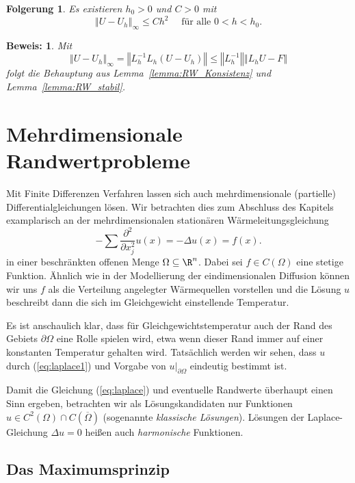 \documentclass[
]{mycourse}
\theoremstyle{mythm}
\newtheorem{korollar}[theorem]{Folgerung}
\theoremstyle{break}
\newtheorem*{beweis}{Beweis:}
\newcommand{\norm}[1]{\left\Vert#1\right\Vert}		%
\newcommand{\labeq}[1]{\label{eq:#1}}			%
\newcommand{\req}[1]{(\ref{eq:#1})}
\begin{document}
\begin{korollar}
Es existieren $h_0>0$ und $C>0$ mit 
\[
\norm{U-U_h}_\infty\leq C h^2 \quad \mbox{ für alle } 0<h<h_0.
\]
\end{korollar}
\begin{beweis}
Mit
\[
\norm{U-U_h}_\infty = \norm{L_h^{-1} L_h (U-U_h)}\leq \norm{L_h^{-1}} \norm{L_h U-F}
\]
folgt die Behauptung aus Lemma~\ref{lemma:RW_Konsistenz} und Lemma~\ref{lemma:RW_stabil}.
\end{beweis}


\section{Mehrdimensionale Randwertprobleme}

Mit Finite Differenzen Verfahren lassen sich auch mehrdimensionale (partielle) Differentialgleichungen
lösen. Wir betrachten dies zum Abschluss des Kapitels examplarisch an der mehrdimensionalen 
stationären Wärmeleitungsgleichung
\begin{equation}\labeq{laplace1}
-\sum \frac{\partial^2}{\partial x_j^2} u(x)=-\Delta u(x)=f(x).
\end{equation}
in einer beschränkten offenen Menge $\Omega\subseteq \R^n$. Dabei sei $f\in C(\Omega)$ eine stetige Funktion.
Ähnlich wie in der Modellierung der eindimensionalen Diffusion können wir uns $f$ als die Verteilung angelegter
Wärmequellen vorstellen und die Lösung $u$ beschreibt dann die sich im Gleichgewicht einstellende Temperatur.

Es ist anschaulich klar, dass für Gleichgewichtstemperatur auch der Rand des Gebiets
$\partial \Omega$ eine Rolle spielen wird, etwa wenn dieser Rand immer auf einer konstanten Temperatur gehalten wird.
Tatsächlich werden wir sehen, dass $u$ durch \req{laplace1} und Vorgabe von $u|_{\partial \Omega}$ eindeutig bestimmt ist.

Damit die Gleichung \req{laplace} und eventuelle Randwerte überhaupt einen Sinn ergeben,
betrachten wir als Lösungskandidaten nur Funktionen $u\in C^2(\Omega)\cap C(\overline \Omega)$ (sogenannte \emph{klassische Lösungen}). Lösungen der Laplace-Gleichung $\Delta u=0$ heißen auch \emph{harmonische} Funktionen.

\subsection{Das Maximumsprinzip}
\end{document}
